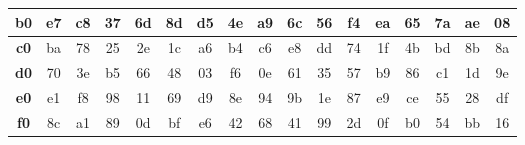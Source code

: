 \begin{table}[h!]
\begin{tabular}{|c|c|c|c|c|c|c|c|c|c|c|c|c|c|c|c|c|}
		\textbf{b0} & e7 & c8 & 37 & 6d & 8d & d5 & 4e & a9 & 6c & 56 & f4 & ea & 65 & 7a & ae & 08 \\ \hline
		\textbf{c0} & ba & 78 & 25 & 2e & 1c & a6 & b4 & c6 & e8 & dd & 74 & 1f & 4b & bd & 8b & 8a \\ \hline
		\textbf{d0} & 70 & 3e & b5 & 66 & 48 & 03 & f6 & 0e & 61 & 35 & 57 & b9 & 86 & c1 & 1d & 9e \\ \hline
		\textbf{e0} & e1 & f8 & 98 & 11 & 69 & d9 & 8e & 94 & 9b & 1e & 87 & e9 & ce & 55 & 28 & df \\ \hline
		\textbf{f0} & 8c & a1 & 89 & 0d & bf & e6 & 42 & 68 & 41 & 99 & 2d & 0f & b0 & 54 & bb & 16 \\ \hline
	\end{tabular}
\end{table}